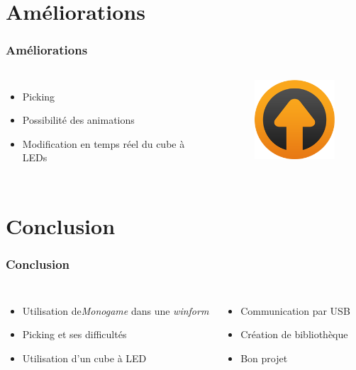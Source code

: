 \documentclass[aspectratio=169]{beamer} %
\begin{document}
	\section{Améliorations}
	\begin{frame}
		\frametitle{Améliorations}
		\begin{columns}[c]
			\begin{itemize}
				\item Picking
				\item Possibilité des animations
				\item Modification en temps réel du cube à LEDs
			\end{itemize}
		
			\begin{figure}
				\centering
				\includegraphics[width=3cm]{Img/upgrade.png}
			\end{figure}
		\end{columns}
	\end{frame}
	
	\section{Conclusion}
	\begin{frame}
		\frametitle{Conclusion}
		\begin{columns}[c]
			\column{.55\textwidth}
			\begin{itemize}
				\item Utilisation de\emph{Monogame} dans une \emph{winform}
				\item Picking et ses difficultés
				\item Utilisation d'un cube à LED
			\end{itemize}
			
			\column{.45\textwidth}
			\begin{itemize}
				\item Communication par USB
				\item Création de bibliothèque
				\item Bon projet
			\end{itemize}
		\end{columns}
		
	\end{frame}
	
\end{document}
